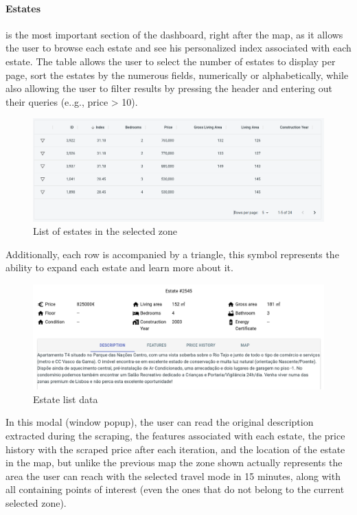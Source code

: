 \paragraph{Estates} is the most important section of the dashboard, right after the map, as it allows the user to browse each estate and see his personalized index associated with each estate. The table allows the user to select the number of estates to display per page, sort the estates by the numerous fields, numerically or alphabetically, while also allowing the user to filter results by pressing the header and entering out their queries (e..g., price > 10).

\begin{figure}[h]
	\centering
	\includegraphics[width=1\linewidth]{Chapters/img/frontend/OverviewEstateListIndex.png}
	\caption{List of estates in the selected zone}
	\label{fig:overviewListEstate}
\end{figure}

Additionally, each row is accompanied by a triangle, this symbol represents the ability to expand each estate and learn more about it.

\begin{figure}[h]
	\centering
	\includegraphics[width=1\linewidth]{Chapters/img/frontend/DetailedDescription.png}
	\caption{Estate list data}
	\label{fig:detailed}
\end{figure}

In this modal (window popup), the user can read the original description extracted during the scraping, the features associated with each estate, the price history with the scraped price after each iteration, and the location of the estate in the map, but unlike the previous map the zone shown actually represents the area the user can reach with the selected travel mode in 15 minutes, along with all containing points of interest (even the ones that do not belong to the current selected zone). 

